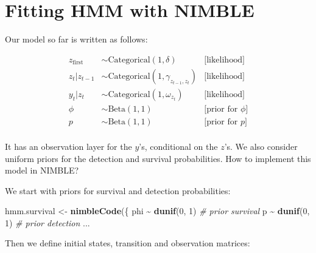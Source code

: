 \documentclass[
  12pt,
]{krantz}
\newenvironment{Shaded}{\begin{snugshade}}{\end{snugshade}}
\newcommand{\CommentTok}[1]{\textcolor[rgb]{0.56,0.35,0.01}{\textit{#1}}}
\newcommand{\DecValTok}[1]{\textcolor[rgb]{0.00,0.00,0.81}{#1}}
\newcommand{\FunctionTok}[1]{\textcolor[rgb]{0.13,0.29,0.53}{\textbf{#1}}}
\newcommand{\NormalTok}[1]{#1}
\newcommand{\OtherTok}[1]{\textcolor[rgb]{0.56,0.35,0.01}{#1}}
\newcommand{\SpecialCharTok}[1]{\textcolor[rgb]{0.81,0.36,0.00}{\textbf{#1}}}
\begin{document}
\hypertarget{fittinghmmnimble}{%
\section{Fitting HMM with NIMBLE}\label{fittinghmmnimble}}

Our model so far is written as follows:

\begin{align*}
   z_{\text{first}} &\sim \text{Categorical}(1, \delta) &\text{[likelihood]}\\
   z_t | z_{t-1} &\sim \text{Categorical}(1, \gamma_{z_{t-1},z_{t}}) &\text{[likelihood]}\\
   y_t | z_{t} &\sim \text{Categorical}(1, \omega_{z_{t}}) &\text{[likelihood]}\\
  \phi &\sim \text{Beta}(1, 1) &\text{[prior for }\phi \text{]} \\
  p &\sim \text{Beta}(1, 1) &\text{[prior for }p \text{]} \\
\end{align*}

It has an observation layer for the \(y\)'s, conditional on the \(z\)'s. We also consider uniform priors for the detection and survival probabilities. How to implement this model in NIMBLE?

We start with priors for survival and detection probabilities:

\begin{Shaded}
\begin{Highlighting}[]
\NormalTok{hmm.survival }\OtherTok{\textless{}{-}} \FunctionTok{nimbleCode}\NormalTok{(\{}
\NormalTok{  phi }\SpecialCharTok{\textasciitilde{}} \FunctionTok{dunif}\NormalTok{(}\DecValTok{0}\NormalTok{, }\DecValTok{1}\NormalTok{) }\CommentTok{\# prior survival}
\NormalTok{  p }\SpecialCharTok{\textasciitilde{}} \FunctionTok{dunif}\NormalTok{(}\DecValTok{0}\NormalTok{, }\DecValTok{1}\NormalTok{) }\CommentTok{\# prior detection}
\NormalTok{...}
\end{Highlighting}
\end{Shaded}

Then we define initial states, transition and observation matrices:
\end{document}
